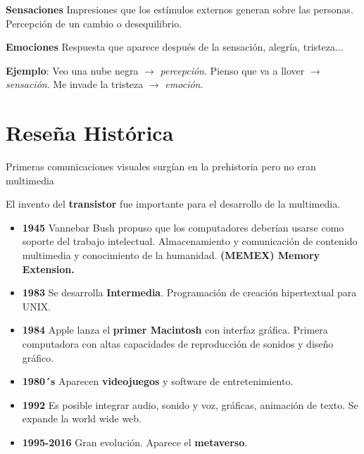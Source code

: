 \documentclass[11pt,a4paper]{article}
\begin{document}
	\begin{DefBox}
		\textbf{Sensaciones} Impresiones que los estímulos externos generan sobre las personas. Percepción de un cambio o desequilibrio.
	\end{DefBox}
	
	\begin{DefBox}
		\textbf{Emociones} Respuesta que aparece después de la sensación, alegría, tristeza...
	\end{DefBox}
	
	\textbf{Ejemplo}:  
	Veo una nube negra $\rightarrow$ \textit{percepción}.  
	Pienso que va a llover $\rightarrow$ \textit{sensación}.  
	Me invade la tristeza $\rightarrow$ \textit{emoción}.
	
	\section{Reseña Histórica}
	Primeras comunicaciones visuales surgían en la prehistoria pero no eran multimedia
	
	El invento del \textbf{transistor} fue importante para el desarrollo de la multimedia.
	
	\begin{itemize}[]
		\item \textbf{1945} Vannebar Bush propuso que los computadores deberían usarse como soporte del trabajo intelectual. Almacenamiento y comunicación de contenido multimedia y conocimiento de la humanidad. \textbf{(MEMEX) Memory Extension.}
		
		\item \textbf{1983} Se desarrolla \textbf{Intermedia}. Programación de creación hipertextual para UNIX.
		
		\item \textbf{1984} Apple lanza el \textbf{primer Macintosh} con interfaz gráfica. Primera computadora con altas capacidades de reproducción de sonidos y diseño gráfico.
		
		\item \textbf{1980´s} Aparecen \textbf{videojuegos} y software de entretenimiento.
		
		\item \textbf{1992} Es posible integrar audio, sonido  y voz, gráficas, animación de texto. Se expande la world wide web.
		
		\item \textbf{1995-2016} Gran evolución. Aparece el \textbf{metaverso}.
	\end{itemize}
	
\end{document}
